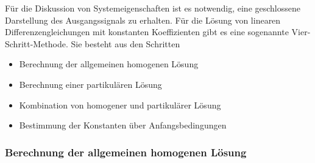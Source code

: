 Für die Diskussion von Systemeigenschaften ist es notwendig, eine geschlossene Darstellung des Ausgangssignals zu erhalten. Für die Lösung von linearen Differenzengleichungen mit konstanten Koeffizienten gibt es eine sogenannte Vier-Schritt-Methode. Sie besteht aus den Schritten

\begin{itemize}
\item
  Berechnung der allgemeinen homogenen Lösung
\item
  Berechnung einer partikulären Lösung
\item
  Kombination von homogener und partikulärer Lösung
\item
  Bestimmung der Konstanten über Anfangsbedingungen
\end{itemize}

\subsubsection{Berechnung der allgemeinen homogenen Lösung}\label{sec:berechnung-der-allgemeinen-homogenen-luxf6sung}

